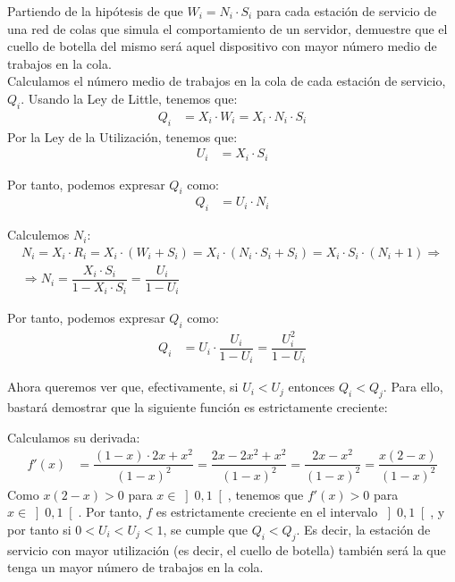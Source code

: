 \begin{ejercicio}\label{ej:5.34}
    Partiendo de la hipótesis de que $W_i = N_i \cdot S_i$ para cada estación de servicio de una red de colas que simula el comportamiento de un servidor, demuestre que el cuello de botella del mismo será aquel dispositivo con mayor número medio de trabajos en la cola.\\

    Calculamos el número medio de trabajos en la cola de cada estación de servicio, $Q_i$. Usando la Ley de Little, tenemos que:
    \begin{align*}
        Q_i &= X_i \cdot W_i = X_i \cdot N_i \cdot S_i
    \end{align*}
    Por la Ley de la Utilización, tenemos que:
    \begin{align*}
        U_i &= X_i \cdot S_i
    \end{align*}

    Por tanto, podemos expresar $Q_i$ como:
    \begin{align*}
        Q_i &= U_i\cdot N_i
    \end{align*}

    Calculemos $N_i$:
    \begin{multline*}
        N_i = X_i\cdot R_i = X_i \cdot (W_i + S_i) = X_i \cdot (N_i \cdot S_i + S_i) = X_i \cdot S_i \cdot (N_i + 1)
        \Longrightarrow \\\Longrightarrow N_i = \dfrac{X_i \cdot S_i}{1 - X_i \cdot S_i} = \dfrac{U_i}{1 - U_i}
    \end{multline*}

    Por tanto, podemos expresar $Q_i$ como:
    \begin{align*}
        Q_i &= U_i \cdot \dfrac{U_i}{1 - U_i} = \dfrac{U_i^2}{1 - U_i}
    \end{align*}

    Ahora queremos ver que, efectivamente, si $U_i<U_j$ entonces $Q_i<Q_j$. Para ello, bastará demostrar que la siguiente función es estrictamente creciente:
    \Func{f}{[0,1[}{\bb{R}}{x}{\frac{x^2}{1-x}}

    Calculamos su derivada:
    \begin{align*}
        f'(x) &= \dfrac{(1-x)\cdot 2x +x^2}{(1-x)^2} = \dfrac{2x - 2x^2 + x^2}{(1-x)^2} = \dfrac{2x - x^2}{(1-x)^2} = \dfrac{x(2-x)}{(1-x)^2}
    \end{align*}
    Como $x(2-x) > 0$ para $x \in \left]0, 1\right[$, tenemos que $f'(x) > 0$ para $x \in \left]0, 1\right[$. Por tanto, $f$ es estrictamente creciente en el intervalo $\left]0, 1\right[$, y por tanto si $0 < U_i < U_j < 1$, se cumple que $Q_i < Q_j$. Es decir, la estación de servicio con mayor utilización (es decir, el cuello de botella) también será la que tenga un mayor número de trabajos en la cola.
\end{ejercicio}
